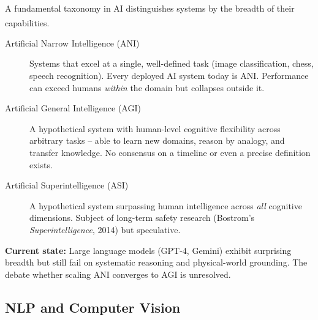     \begin{tcbitemize}[ skin=sectionraster ]
        \tcbitem[title={ANI vs AGI vs ASI}, raster multicolumn=6]
        A fundamental taxonomy in AI distinguishes systems by the breadth of their capabilities.\textsuperscript{\cite{adjaouteAI2024}}

        \begin{description}
            \item[Artificial Narrow Intelligence (ANI)] Systems that excel at a single, well-defined task (image classification, chess, speech recognition). Every deployed AI system today is ANI. Performance can exceed humans \emph{within} the domain but collapses outside it.
            \item[Artificial General Intelligence (AGI)] A hypothetical system with human-level cognitive flexibility across arbitrary tasks -- able to learn new domains, reason by analogy, and transfer knowledge. No consensus on a timeline or even a precise definition exists.
            \item[Artificial Superintelligence (ASI)] A hypothetical system surpassing human intelligence across \emph{all} cognitive dimensions. Subject of long-term safety research (Bostrom's \emph{Superintelligence}, 2014) but speculative.
        \end{description}

        \textbf{Current state:} Large language models (GPT-4, Gemini) exhibit surprising breadth but still fail on systematic reasoning and physical-world grounding. The debate whether scaling ANI converges to AGI is unresolved.
    \end{tcbitemize}

    \subsection{NLP and Computer Vision}

